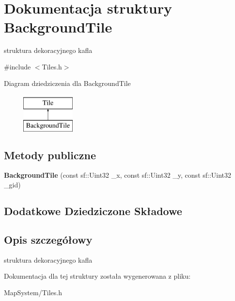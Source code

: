 \hypertarget{struct_background_tile}{\section{Dokumentacja struktury Background\-Tile}
\label{struct_background_tile}
}


struktura dekoracyjnego kafla  




{\ttfamily \#include $<$Tiles.\-h$>$}

Diagram dziedziczenia dla Background\-Tile\begin{figure}[H]
\begin{center}
\leavevmode
\includegraphics[height=2.000000cm]{struct_background_tile}
\end{center}
\end{figure}
\subsection*{Metody publiczne}
\begin{DoxyCompactItemize}
\item 
\hypertarget{struct_background_tile_ae57f73e5ceef82262afd018d13ede543}{{\bfseries Background\-Tile} (const sf\-::\-Uint32 \-\_\-x, const sf\-::\-Uint32 \-\_\-y, const sf\-::\-Uint32 \-\_\-gid)}\label{struct_background_tile_ae57f73e5ceef82262afd018d13ede543}

\end{DoxyCompactItemize}
\subsection*{Dodatkowe Dziedziczone Składowe}


\subsection{Opis szczegółowy}
struktura dekoracyjnego kafla 

Dokumentacja dla tej struktury została wygenerowana z pliku\-:\begin{DoxyCompactItemize}
\item 
Map\-System/Tiles.\-h\end{DoxyCompactItemize}
